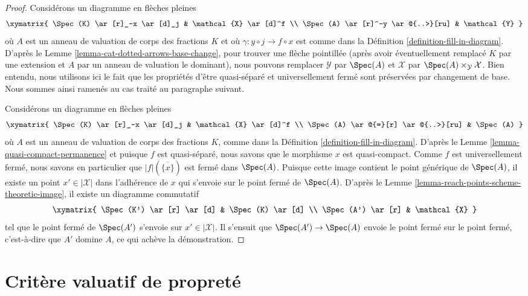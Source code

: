 \begin{proof}
Considérons un diagramme en flèches pleines
$$
\xymatrix{
\Spec(K) \ar[r]_-x \ar[d]_j & \mathcal{X} \ar[d]^f \\
\Spec(A) \ar[r]^-y \ar@{..>}[ru] & \mathcal{Y}
}
$$
où $A$ est un anneau de valuation de corps des fractions $K$
et où $\gamma : y \circ j \longrightarrow f \circ x$ est comme dans la
Définition \ref{definition-fill-in-diagram}. D'après le
Lemme \ref{lemma-cat-dotted-arrows-base-change},
pour trouver une flèche pointillée (après avoir éventuellement remplacé
$K$ par une extension et $A$ par un anneau de valuation le dominant),
nous pouvons remplacer $\mathcal{Y}$ par $\Spec(A)$ et $\mathcal{X}$
par $\Spec(A) \times_\mathcal{Y} \mathcal{X}$. Bien entendu,
nous utilisons ici le fait que les propriétés d'être
quasi-séparé et universellement fermé sont préservées par changement de base.
Nous sommes ainsi ramenés au cas traité au paragraphe suivant.

\medskip\noindent
Considérons un diagramme en flèches pleines
$$
\xymatrix{
\Spec(K) \ar[r]_-x \ar[d]_j & \mathcal{X} \ar[d]^f \\
\Spec(A) \ar@{=}[r] \ar@{..>}[ru] & \Spec(A)
}
$$
où $A$ est un anneau de valuation de corps des fractions $K$, comme dans la
Définition \ref{definition-fill-in-diagram}.
D'après le Lemme \ref{lemma-quasi-compact-permanence} et puisque
$f$ est quasi-séparé, nous savons que
le morphisme $x$ est quasi-compact.
Comme $f$ est universellement fermé, nous savons en particulier
que $|f|(\overline{\{x\}})$ est fermé dans $\Spec(A)$.
Puisque cette image contient le point générique de $\Spec(A)$,
il existe un point $x' \in |\mathcal{X}|$ dans l'adhérence
de $x$ qui s'envoie sur le point fermé de $\Spec(A)$.
D'après le Lemme \ref{lemma-reach-points-scheme-theoretic-image},
il existe un diagramme commutatif
$$
\xymatrix{
\Spec(K') \ar[r] \ar[d] & \Spec(K) \ar[d] \\
\Spec(A') \ar[r] & \mathcal{X}
}
$$
tel que le point fermé de $\Spec(A')$ s'envoie sur $x' \in |\mathcal{X}|$.
Il s'ensuit que $\Spec(A') \to \Spec(A)$ envoie le point fermé
sur le point fermé, c'est-à-dire que $A'$ domine $A$, ce qui achève la démonstration.
\end{proof}





\section{Critère valuatif de propreté}
\label{section-valutive-criterion-properness}

